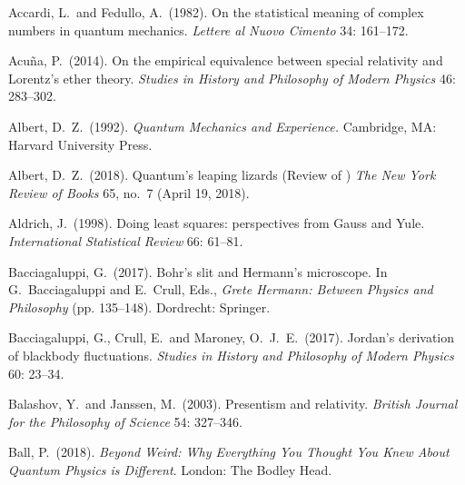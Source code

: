 \documentclass[12pt]{article}
\numberwithin{equation}{section}
\begin{document}
\renewcommand{\refname}{Bibliography}

\begin{thebibliography}{}

  Accardi, L.\ and Fedullo, A.\ (1982). On the statistical meaning of complex numbers in quantum mechanics. \emph{Lettere al Nuovo Cimento} 34: 161--172.

 Acu\~na, P.\ (2014). On the empirical equivalence between special relativity and Lorentz's ether theory. {\em Studies in History and Philosophy of Modern Physics} 46: 283--302.

 Albert, D.\ Z.\ (1992). \emph{Quantum Mechanics and Experience.} Cambridge, MA: Harvard University Press.

 Albert, D.\ Z.\ (2018). Quantum's leaping lizards (Review of \citet{Becker 2018}) \emph{The New York Review of Books} 65, no.\ 7 (April 19, 2018).

 Aldrich, J.\ (1998). Doing least squares: perspectives from Gauss and Yule. \emph{International Statistical Review} 66: 61--81.

 Bacciagaluppi, G.\ (2017). Bohr's slit and Hermann's microscope. In G.\ Bacciagaluppi and E.\ Crull, Eds., \emph{Grete Hermann: Between Physics and Philosophy} (pp. 135--148). Dordrecht: Springer.

 Bacciagaluppi, G., Crull, E.\ and Maroney, O.\ J.\ E.\ (2017). Jordan's derivation of blackbody fluctuations. \emph{Studies in History and Philosophy of Modern Physics} 60: 23--34.

 Balashov, Y.\ and Janssen, M.\ (2003). Presentism and relativity.  {\it British Journal for the Philosophy of Science}
 54: 327--346.

 Ball, P.\ (2018). \emph{Beyond Weird: Why Everything You Thought You Knew About Quantum Physics is Different}. London: The Bodley Head.



\end{thebibliography}
\end{document}
